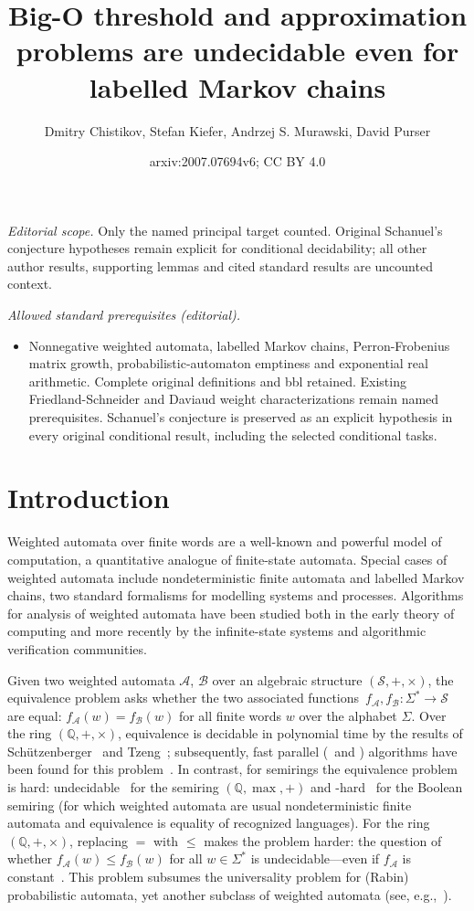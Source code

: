 \documentclass[10pt,a4paper]{amsart}
\title{Big-O threshold and approximation problems are undecidable even for labelled Markov chains}
\author{Dmitry Chistikov, Stefan Kiefer, Andrzej S. Murawski, David Purser}
\date{arxiv:2007.07694v6; CC BY 4.0}
\numberwithin{equation}{section}
\theoremstyle{plain}
\theoremstyle{definition}
\theoremstyle{remark}
\begin{document}
\maketitle
\noindent\textit{Editorial scope.} Only the named principal target counted. Original Schanuel's conjecture hypotheses remain explicit for conditional decidability; all other author results, supporting lemmas and cited standard results are uncounted context.\par\medskip
\noindent\textit{Allowed standard prerequisites (editorial).}\begin{itemize}
\item Nonnegative weighted automata, labelled Markov chains, Perron-Frobenius matrix growth, probabilistic-automaton emptiness and exponential real arithmetic. Complete original definitions and bbl retained. Existing Friedland-Schneider and Daviaud weight characterizations remain named prerequisites. Schanuel's conjecture is preserved as an explicit hypothesis in every original conditional result, including the selected conditional tasks.
\end{itemize}\medskip
\section{Introduction}\label{sec:intro}

Weighted automata over finite words
are a well-known and powerful model of computation,
a quantitative analogue of finite-state automata.
Special cases of weighted automata include
nondeterministic finite automata
and labelled Markov chains, two standard formalisms for modelling systems
and processes.
Algorithms for analysis of weighted automata have been studied
both in the early theory of computing and
more recently by the infinite-state systems and algorithmic verification
communities.

Given two weighted automata $\mathcal A$, $\mathcal B$
over an algebraic structure $(\mathcal S, {+}, {\times})$,
the equivalence problem asks whether the two associated functions~$f_{\mathcal A}, f_{\mathcal B} \colon \Sigma^* \to \mathcal S$
are equal: $f_{\mathcal A}(w) = f_{\mathcal B}(w)$ for all finite
words $w$ over the alphabet $\Sigma$.
Over the ring $(\mathbb Q, {+}, {\times})$,
equivalence
is decidable in polynomial time by the results of
Sch\"utzenberger~\cite{schutzenberger1961definition} and Tzeng~\cite{tzeng1992polynomial};
subsequently, fast parallel (\NC\ and \RNC) algorithms have been found
for this problem~\cite{Tzeng96,kiefer2013complexity}.
In contrast, for semirings the equivalence problem is hard:
undecidable~\cite{Krob94,AlmagorBK11} for the semiring $(\mathbb Q, {\max}, {+})$
and \PSPACE-hard~\cite{MS72} for the Boolean semiring
(for which weighted automata are usual nondeterministic finite automata
 and equivalence is equality of recognized languages).
For the ring $(\mathbb Q, {+}, {\times})$, replacing $=$ with $\le$ makes the problem harder:
the question of whether $f_{\mathcal A}(w) \le f_{\mathcal B}(w)$
for all $w \in \Sigma^*$ is undecidable---even if $f_{\mathcal A}$ is constant~\cite{paz2014introduction}.
This problem subsumes the universality problem for (Rabin) probabilistic automata,
yet another subclass of weighted automata (see, e.g.,~\cite{fijalkow2017undecidability}).
\end{document}
